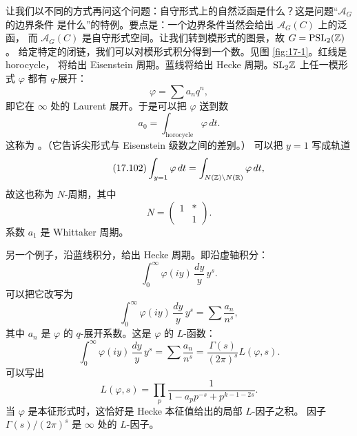 让我们以不同的方式再问这个问题：自守形式上的自然泛函是什么？这是问题“$\mathcal A_G$ 的边界条件
是什么”的特例。要点是：一个边界条件当然会给出 $\mathcal A_G(C)$ 上的泛函，
而 $\mathcal A_G(C)$ 是自守形式空间。让我们转到模形式的图景，故 $G=\mathrm{PSL}_2(\mathbb{Z})$。
给定特定的闭链，我们可以对模形式积分得到一个数。见图 \ref{fig:17-1}。红线是 horocycle，
将给出 Eisenstein 周期。蓝线将给出 Hecke 周期。$\mathrm{SL}_2\mathbb{Z}$ 上任一模形式 $\varphi$
都有 $q$-展开：
\begin{equation}\tag{17.100}\label{eq:17.100}
\varphi=\sum a_n q^n,
\end{equation}
即它在 $\infty$ 处的 Laurent 展开。于是可以把 $\varphi$ 送到数
\begin{equation}\tag{17.101}\label{eq:17.101}
a_0=\int_{\text{horocycle}}\varphi\,dt.
\end{equation}
这称为 。（它告诉尖形式与 Eisenstein 级数之间的差别。）
可以把 $y=1$ 写成轨道
\begin{equation}\tag{17.102}\label{eq:17.102}
\int_{y=1}\varphi\,dt=\int_{N(\mathbb{Z})\backslash N(\mathbb{R})}\varphi\,dt,
\end{equation}
故这也称为 $N$-周期，其中
\begin{equation}\tag{17.103}\label{eq:17.103}
N=\begin{pmatrix}1&*\\&1\end{pmatrix}.
\end{equation}
系数 $a_1$ 是 Whittaker 周期。

另一个例子，沿蓝线积分，给出 Hecke 周期。即沿虚轴积分：
\begin{equation}\tag{17.104}\label{eq:17.104}
\int_0^{\infty}\varphi(iy)\,\frac{dy}{y}\,y^s.
\end{equation}
可以把它改写为
\begin{equation}\tag{17.105}\label{eq:17.105}
\int_0^{\infty}\varphi(iy)\,\frac{dy}{y}\,y^s=\sum\frac{a_n}{n^s},
\end{equation}
其中 $a_n$ 是 $\varphi$ 的 $q$-展开系数。这是 $\varphi$ 的 $L$-函数：
\begin{equation}\tag{17.106}\label{eq:17.106}
\int_0^{\infty}\varphi(iy)\,\frac{dy}{y}\,y^s
=\sum\frac{a_n}{n^s}=\frac{\Gamma(s)}{(2\pi)^s}L(\varphi,s).
\end{equation}
可以写出
\begin{equation}\tag{17.107}\label{eq:17.107}
L(\varphi,s)=\prod_p\frac{1}{1-a_p p^{-s}+p^{k-1-2s}}.
\end{equation}
当 $\varphi$ 是本征形式时，这恰好是 Hecke 本征值给出的局部 $L$-因子之积。
因子 $\Gamma(s)/(2\pi)^s$ 是 $\infty$ 处的 $L$-因子。

